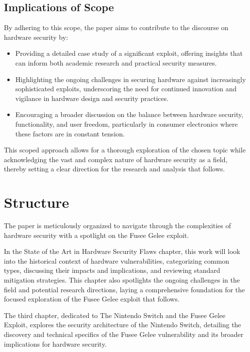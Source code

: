 \hypertarget{implications-of-scope}{%
\subsection{Implications of Scope}\label{implications-of-scope}}

By adhering to this scope, the paper aims to contribute to the
discourse on hardware security by:

\begin{itemize}
\item
  Providing a detailed case study of a significant exploit, offering
  insights that can inform both academic research and practical security
  measures.
\item
  Highlighting the ongoing challenges in securing hardware against
  increasingly sophisticated exploits, underscoring the need for
  continued innovation and vigilance in hardware design and security
  practices.
\item
  Encouraging a broader discussion on the balance between hardware
  security, functionality, and user freedom, particularly in consumer
  electronics where these factors are in constant tension.
\end{itemize}

This scoped approach allows for a thorough exploration of the chosen
topic while acknowledging the vast and complex nature of hardware
security as a field, thereby setting a clear direction for the research
and analysis that follows.

\hypertarget{structure}{%
\section{Structure}\label{structure}}

The paper is meticulously organized to navigate through the
complexities of hardware security with a spotlight on the Fusee Gelee
exploit.

In the State of the Art in Hardware Security Flaws chapter, this work
will look into the historical context of hardware vulnerabilities,
categorizing common types, discussing their impacts and implications,
and reviewing standard mitigation strategies. This chapter also
spotlights the ongoing challenges in the field and potential research
directions, laying a comprehensive foundation for the focused
exploration of the Fusee Gelee exploit that follows.

The third chapter, dedicated to The Nintendo Switch and the Fusee Gelee
Exploit, explores the security architecture of the Nintendo Switch,
detailing the discovery and technical specifics of the Fusee Gelee
vulnerability and its broader implications for hardware security.

